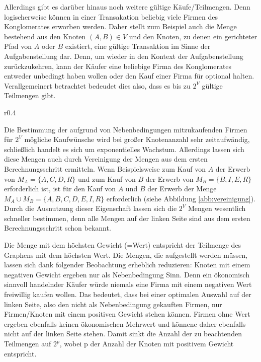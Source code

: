 Allerdings gibt es darüber hinaus noch weitere gültige Käufe/Teilmengen. Denn logischerweise können in einer Transakation beliebig viele Firmen des Konglomerates erworben werden. Daher stellt zum Beispiel auch die Menge bestehend aus den Knoten \((A, B) \in V\) und den Knoten, zu denen ein gerichteter Pfad von \(A\) oder \(B\) existiert, eine gültige Transaktion im Sinne der Aufgabenstellung dar. Denn, um wieder in den Kontext der Aufgabenstellung zurückzukehren, kann der Käufer eine beliebige Firma des Konglomerates entweder unbedingt haben wollen oder den Kauf einer Firma für optional halten. Verallgemeinert betrachtet bedeudet dies also, dass es bis zu \(2^V\) gültige Teilmengen gibt.

\begin{wrapfigure}{r}{0.4\textwidth}
  \begin{center}
    
  \end{center}
  \caption{Beispielgraph}
  \label{abb:vereinigung}
\end{wrapfigure}


Die Bestimmung der aufgrund von Nebenbedingungen mitzukaufenden Firmen für \(2^V\) mögliche Kaufwünsche wird bei großer Knotenanzahl sehr zeitaufwändig, schließlich handelt es sich um exponentielles Wachstum. Allerdings lassen sich diese Mengen auch durch Vereinigung der Mengen aus dem ersten Berechnungsschritt ermitteln. Wenn Beispielsweise zum Kauf von \(A\) der Erwerb von \(M_A=\{A, C, D, R\}\) und zum Kauf von \(B\) der Erwerb von \(M_B = \{B, I, E, R\}\) erforderlich ist, ist für den Kauf von \(A\) und \(B\) der Erwerb der Menge \(M_A \cup M_B = \{A, B, C, D, E, I, R\}\) erforderlich (siehe Abbildung \ref{abb:vereinigung}). Durch die Ausnutzung dieser Eigenschaft lassen sich die \(2^V\) Mengen wesentlich schneller bestimmen, denn alle Mengen auf der linken Seite sind aus dem ersten Berechnungsschritt schon bekannt.

Die Menge mit dem höchsten Gewicht (=Wert) entspricht der Teilmenge des Graphens mit dem höchsten Wert.
Die Mengen, die aufgestellt werden müssen, lassen sich dank folgender Beobachtung erheblich reduzieren:
Knoten mit einem negativen Gewicht ergeben nur als Nebenbedingung Sinn. Denn ein ökonomisch sinnvoll handelnder Käufer würde niemals eine Firma mit einem negativen Wert freiwillig kaufen wollen. Das bedeutet, dass bei einer optimalen Auswahl auf der linken Seite, also den nicht als Nebenbedingung gekauften Firmen, nur Firmen/Knoten mit einem positiven Gewicht stehen können. Firmen ohne Wert ergeben ebenfalls keinen ökonomischen Mehrwert und könnene daher ebenfalls nicht auf der linken Seite stehen. Damit sinkt die Anzahl der zu beachtenden Teilmengen auf \(2^p\), wobei p der Anzahl der Knoten mit positivem Gewicht entspricht.

